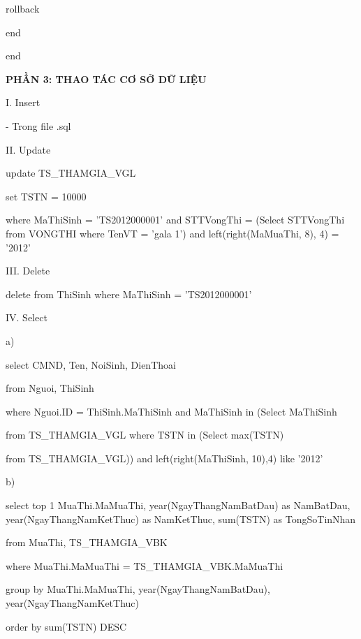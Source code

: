 \documentclass{report}
\begin{document}
		rollback
		
	\setlength{\parindent}{1.5cm}
	end
	
	\setlength{\parindent}{0.5cm}	
end




\newpage
\changefontsizes{16pt}
\centerline{\textbf{PHẦN 3: THAO TÁC CƠ SỞ DỮ LIỆU }}

\bigskip
\changefontsizes{13pt}
\setlength{\parindent}{0cm}
I. Insert

- Trong file .sql

\bigskip
\changefontsizes{13pt}
\setlength{\parindent}{0cm}
II. Update

\setlength{\parindent}{0.5cm}
update TS\_THAMGIA\_VGL

set TSTN = 10000

where MaThiSinh = 'TS2012000001' and  STTVongThi = (Select STTVongThi from VONGTHI where TenVT = 'gala 1') and left(right(MaMuaThi, 8), 4) = '2012'


\bigskip
\changefontsizes{13pt}
\setlength{\parindent}{0cm}
III. Delete

\setlength{\parindent}{0.5cm}
delete from ThiSinh
where MaThiSinh = 'TS2012000001'


\bigskip
\changefontsizes{13pt}
\setlength{\parindent}{0cm}
IV.  Select 

a)

\setlength{\parindent}{0.5cm}
select CMND, Ten, NoiSinh, DienThoai

from Nguoi, ThiSinh

where Nguoi.ID = ThiSinh.MaThiSinh and  MaThiSinh in (Select MaThiSinh

from TS\_THAMGIA\_VGL where TSTN in (Select max(TSTN)

from TS\_THAMGIA\_VGL)) and left(right(MaThiSinh, 10),4) like '2012'

\setlength{\parindent}{0cm}
\bigskip
b)

\setlength{\parindent}{0.5cm}
select top 1 MuaThi.MaMuaThi, year(NgayThangNamBatDau) as NamBatDau, year(NgayThangNamKetThuc) as NamKetThuc, sum(TSTN) as TongSoTinNhan

from MuaThi, TS\_THAMGIA\_VBK

where MuaThi.MaMuaThi = TS\_THAMGIA\_VBK.MaMuaThi

group by MuaThi.MaMuaThi, year(NgayThangNamBatDau),\\year(NgayThangNamKetThuc)

order by sum(TSTN) DESC

\bigskip
\end{document}

